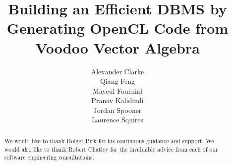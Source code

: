 \documentclass[a4paper, twoside]{report}
\title{Building an Efficient DBMS by Generating OpenCL Code from Voodoo Vector Algebra}
\author{Alexander Clarke \\ Qiang Feng \\ Mayeul Fournial \\ Pranav Kalidindi \\ Jordan Spooner \\ Laurence Squires}
\begin{document}


\renewcommand{\abstractname}{Acknowledgements}
\begin{abstract}
We would like to thank Holger Pirk for his continuous guidance and support. We would also like to thank Robert Chatley for the invaluable advice from each of our software engineering consultations.
\end{abstract}

\tableofcontents












\end{document}
